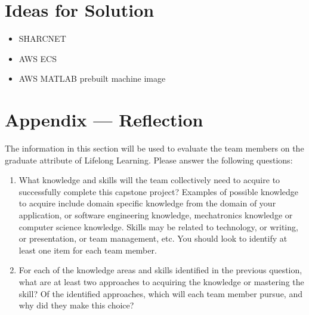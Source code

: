 \documentclass[12pt]{article}
\begin{document}
\section{Ideas for Solution}
\begin{itemize}
    \item SHARCNET
    \item AWS ECS
    \item AWS MATLAB prebuilt machine image
\end{itemize}


\newpage{}
\section*{Appendix --- Reflection}

The information in this section will be used to evaluate the team members on the
graduate attribute of Lifelong Learning.  Please answer the following questions:

\begin{enumerate}
  \item What knowledge and skills will the team collectively need to acquire to
  successfully complete this capstone project?  Examples of possible knowledge
  to acquire include domain specific knowledge from the domain of your
  application, or software engineering knowledge, mechatronics knowledge or
  computer science knowledge.  Skills may be related to technology, or writing,
  or presentation, or team management, etc.  You should look to identify at
  least one item for each team member.
  \item For each of the knowledge areas and skills identified in the previous
  question, what are at least two approaches to acquiring the knowledge or
  mastering the skill?  Of the identified approaches, which will each team
  member pursue, and why did they make this choice?
\end{enumerate}
\end{document}

